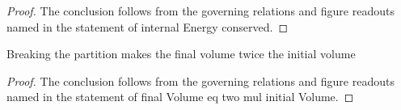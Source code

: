 \begin{proof}
  The conclusion follows from the governing relations and figure readouts named in the statement of internal Energy conserved.
\end{proof}
\begin{lemma}
  \label{lem:physics:phyx-mini-0475:phyxmini0475-finalvolume-eq-two-mul-initialvolume}
  Breaking the partition makes the final volume twice the initial volume
\end{lemma}
\begin{proof}
  The conclusion follows from the governing relations and figure readouts named in the statement of final Volume eq two mul initial Volume.
\end{proof}
